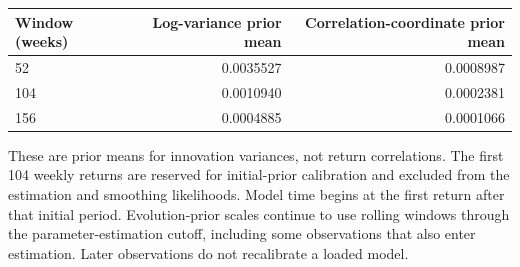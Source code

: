 \par\medskip\noindent
{\small
\begin{tabular}{@{}lrr@{}}
\toprule
Window (weeks) & Log-variance prior mean & Correlation-coordinate prior mean\\
\midrule
52 & 0.0035527 & 0.0008987\\
104 & 0.0010940 & 0.0002381\\
156 & 0.0004885 & 0.0001066\\
\bottomrule
\end{tabular}
}
\par\medskip
These are prior means for innovation variances, not return correlations.
The first 104 weekly returns are reserved for initial-prior calibration and excluded from the estimation and smoothing likelihoods. Model time begins at the first return after that initial period. Evolution-prior scales continue to use rolling windows through the parameter-estimation cutoff, including some observations that also enter estimation. Later observations do not recalibrate a loaded model.\par
